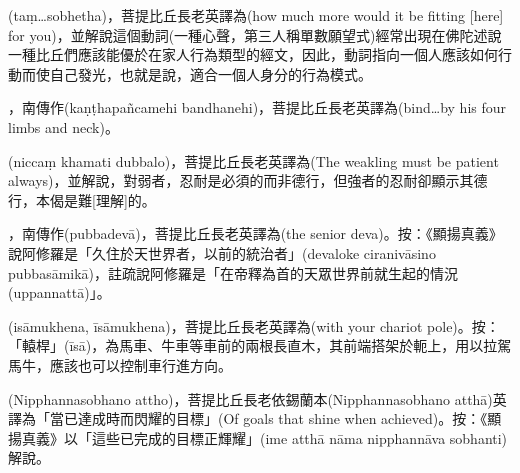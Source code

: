 \startitemgroup[noteitems]
\item{}(taṃ…sobhetha)，菩提比丘長老英譯為(how much more would it be fitting [here] for you)，並解說這個動詞(一種心聲，第三人稱單數願望式)經常出現在佛陀述說一種比丘們應該能優於在家人行為類型的經文，因此，動詞指向一個人應該如何行動而使自己發光，也就是說，適合一個人身分的行為模式。
\stopitemgroup

\startitemgroup[noteitems]
\item{}，南傳作(kaṇṭhapañcamehi bandhanehi)，菩提比丘長老英譯為(bind…by his four limbs and neck)。
\stopitemgroup

\startitemgroup[noteitems]
\item{}(niccaṃ khamati dubbalo)，菩提比丘長老英譯為(The weakling must be patient always)，並解說，對弱者，忍耐是必須的而非德行，但強者的忍耐卻顯示其德行，本偈是難[理解]的。
\stopitemgroup

\startitemgroup[noteitems]
\item{}，南傳作(pubbadevā)，菩提比丘長老英譯為(the senior deva)。按：《顯揚真義》說阿修羅是「久住於天世界者，以前的統治者」(devaloke ciranivāsino pubbasāmikā)，註疏說阿修羅是「在帝釋為首的天眾世界前就生起的情況(uppannattā)」。
\stopitemgroup

\startitemgroup[noteitems]
\item{}(isāmukhena, īsāmukhena)，菩提比丘長老英譯為(with your chariot pole)。按：「轅桿」(īsā)，為馬車、牛車等車前的兩根長直木，其前端搭架於軛上，用以拉駕馬牛，應該也可以控制車行進方向。
\stopitemgroup

\startitemgroup[noteitems]
\item{}(Nipphannasobhano attho)，菩提比丘長老依錫蘭本(Nipphannasobhano atthā)英譯為「當已達成時而閃耀的目標」(Of goals that shine when achieved)。按：《顯揚真義》以「這些已完成的目標正輝耀」(ime atthā nāma nipphannāva sobhanti)解說。
\stopitemgroup

